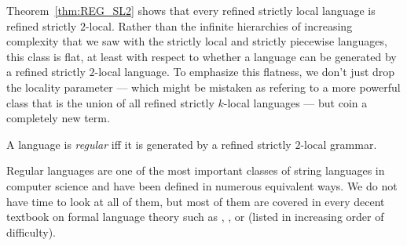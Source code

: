 Theorem~\ref{thm:REG_SL2} shows that every refined strictly local language is refined strictly $2$-local.
Rather than the infinite hierarchies of increasing complexity that we saw with the strictly local and strictly piecewise languages, this class is flat, at least with respect to whether a language can be generated by a refined strictly $2$-local language.
To emphasize this flatness, we don't just drop the locality parameter --- which might be mistaken as refering to a more powerful class that is the union of all refined strictly $k$-local languages --- but coin a completely new term.
%
\begin{definition}
    A language is \emph{regular} iff it is generated by a refined strictly $2$-local grammar.
\end{definition}
%
Regular languages are one of the most important classes of string languages in computer science and have been defined in numerous equivalent ways.
We do not have time to look at all of them, but most of them are covered in every decent textbook on formal language theory such as \citet{Sipser05}, \citet{Kozen97}, or \citet{HopcroftUllman79} (listed in increasing order of difficulty).

